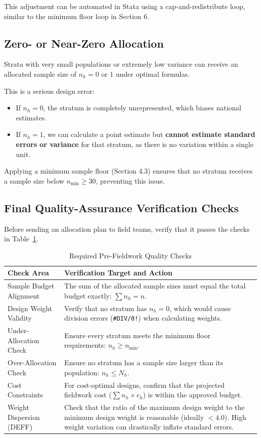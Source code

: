 \documentclass[11pt, a4paper]{article}
\begin{document}
This adjustment can be automated in Stata using a cap-and-redistribute loop, similar to the minimum floor loop in Section 6.

\subsection{Zero- or Near-Zero Allocation}
Strata with very small populations or extremely low variance can receive an allocated sample size of $n_h = 0$ or $1$ under optimal formulas.

This is a serious design error:
\begin{itemize}
    \item If $n_h = 0$, the stratum is completely unrepresented, which biases national estimates.
    \item If $n_h = 1$, we can calculate a point estimate but \textbf{cannot estimate standard errors or variance} for that stratum, as there is no variation within a single unit.
\end{itemize}

Applying a minimum sample floor (Section 4.3) ensures that no stratum receives a sample size below $n_{\text{min}} \ge 30$, preventing this issue.

\subsection{Final Quality-Assurance Verification Checks}
Before sending an allocation plan to field teams, verify that it passes the checks in Table~\ref{tab:qa_matrix}.

\begin{table}[h]
\centering
\caption{Required Pre-Fieldwork Quality Checks}
\label{tab:qa_matrix}
\begin{tabularx}{\textwidth}{l X}
\toprule
\textbf{Check Area} & \textbf{Verification Target and Action} \\
\midrule
Sample Budget Alignment & The sum of the allocated sample sizes must equal the total budget exactly: $\sum n_h = n$. \\
Design Weight Validity & Verify that no stratum has $n_h = 0$, which would cause division errors (\texttt{\#DIV/0!}) when calculating weights. \\
Under-Allocation Check & Ensure every stratum meets the minimum floor requirements: $n_h \ge n_{\text{min}}$. \\
Over-Allocation Check & Ensure no stratum has a sample size larger than its population: $n_h \le N_h$. \\
Cost Constraints & For cost-optimal designs, confirm that the projected fieldwork cost ($\sum n_h \times c_h$) is within the approved budget. \\
Weight Dispersion (DEFF) & Check that the ratio of the maximum design weight to the minimum design weight is reasonable (ideally $< 4.0$). High weight variation can drastically inflate standard errors. \\
\bottomrule
\end{tabularx}
\end{table}
\end{document}
